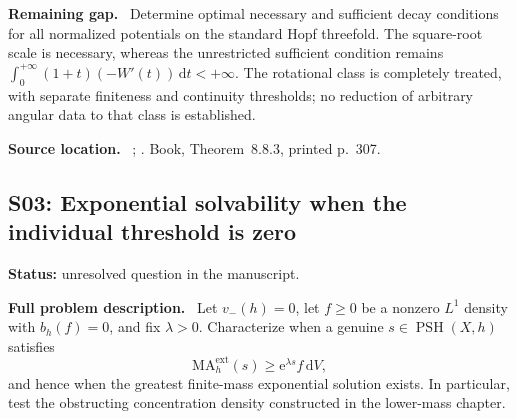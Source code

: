 \documentclass[11pt]{article}
\newcommand{\PSH}{\operatorname{PSH}}
\newcommand{\field}[1]{\par\medskip\noindent\textbf{#1.}\ }
\begin{document}
\field{Remaining gap} Determine optimal necessary and sufficient decay conditions for all normalized potentials on the standard Hopf threefold. The square-root scale is necessary, whereas the unrestricted sufficient condition remains $\int_0^{+\infty}(1+t)(-W'(t))\,\mathrm dt<+\infty$. The rotational class is completely treated, with separate finiteness and continuity thresholds; no reduction of arbitrary angular data to that class is established.
\field{Source location} ; . Book, Theorem~8.8.3, printed p.~307.

\subsection{S03: Exponential solvability when the individual threshold is zero}
\label{S03}
\noindent\textbf{Status:} unresolved question in the manuscript.
\field{Full problem description} Let $v_-(h)=0$, let $f\geq0$ be a nonzero $L^1$ density with $b_h(f)=0$, and fix $\lambda>0$. Characterize when a genuine $s\in\PSH(X,h)$ satisfies
\[\mathrm{MA}^{\mathrm{ext}}_h(s)\geq\mathrm e^{\lambda s}f\,\mathrm dV,\]
and hence when the greatest finite-mass exponential solution exists. In particular, test the obstructing concentration density constructed in the lower-mass chapter.
\end{document}
